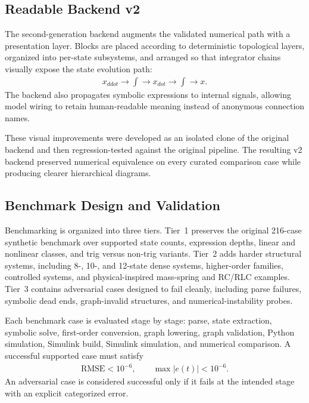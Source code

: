 \documentclass[colorlinks,upint,subscriptcorrection,varvw,balance,nofoot]{asmeconf}
\begin{document}
\subsection{Readable Backend v2}
The second-generation backend augments the validated numerical path with a presentation layer. Blocks are placed according to deterministic topological layers, organized into per-state subsystems, and arranged so that integrator chains visually expose the state evolution path:
\begin{align}
  x_{ddot} \rightarrow \int \rightarrow x_{dot} \rightarrow \int \rightarrow x.
\end{align}
The backend also propagates symbolic expressions to internal signals, allowing model wiring to retain human-readable meaning instead of anonymous connection names.

These visual improvements were developed as an isolated clone of the original backend and then regression-tested against the original pipeline. The resulting v2 backend preserved numerical equivalence on every curated comparison case while producing clearer hierarchical diagrams.

\subsection{Benchmark Design and Validation}
Benchmarking is organized into three tiers. Tier~1 preserves the original 216-case synthetic benchmark over supported state counts, expression depths, linear and nonlinear classes, and trig versus non-trig variants. Tier~2 adds harder structural systems, including 8-, 10-, and 12-state dense systems, higher-order families, controlled systems, and physical-inspired mass-spring and RC/RLC examples. Tier~3 contains adversarial cases designed to fail cleanly, including parse failures, symbolic dead ends, graph-invalid structures, and numerical-instability probes.

Each benchmark case is evaluated stage by stage: parse, state extraction, symbolic solve, first-order conversion, graph lowering, graph validation, Python simulation, Simulink build, Simulink simulation, and numerical comparison. A successful supported case must satisfy
\begin{align}
  \mathrm{RMSE} < 10^{-6}, \qquad \max |e(t)| < 10^{-6}.
\end{align}
An adversarial case is considered successful only if it fails at the intended stage with an explicit categorized error.
\end{document}
